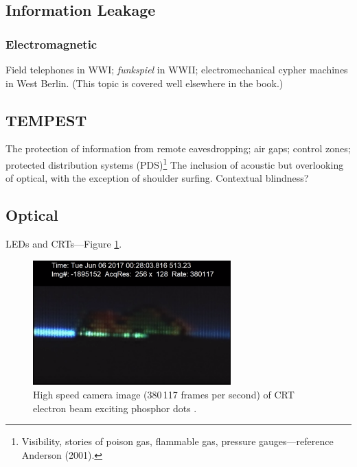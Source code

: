 \documentclass[a4paper,twoside,oldfontcommands]{memoir}
\begin{document}
\subsection{Information Leakage}
\subsubsection{Electromagnetic}
Field telephones in WWI; \emph{funkspiel} in WWII; electromechanical cypher
machines in West Berlin. (This topic is covered well elsewhere in the book.)
\subsection{TEMPEST}
The protection of information from remote eavesdropping; air gaps; control
zones; protected distribution systems (PDS)\footnote{Visibility, stories of
poison gas, flammable gas, pressure gauges---reference Anderson (2001).} The
inclusion of acoustic but overlooking of optical, with the exception of
shoulder surfing. Contextual blindness?
\subsection{Optical}
LEDs and CRTs---Figure \ref{figure:slow-mo_guys_crt}.
\begin{figure}[ht]
  \centering
  \includegraphics[width=3in]{slow-mo_guys_crt.png}
  \caption{High speed camera image (380\,117 frames per second) of CRT electron
    beam exciting phosphor dots \protect\cite{Free2018}.}
  \label{figure:slow-mo_guys_crt}
\end{figure}
\end{document}
